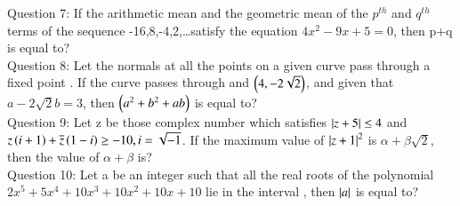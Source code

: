\documentclass[journal,12pt,twocolumn]{IEEEtran}
\theoremstyle{remark}
\begin{document}
Question 7: If the arithmetic mean and the geometric mean of the $p^{th}$ and $q^{th}$ terms of the sequence -16,8,-4,2,\ldots satisfy the equation $4x^2-9x+5=0$, then p+q is equal to?\vspace{0.5mm}\\
Question 8: Let the normals at all the points on a given curve pass through a fixed point . If the curve passes through  and $\left(4,-2\sqrt{2}\right)$, and given that $a-2\sqrt{2}b = 3$, then $\left(a^2+b^2+ab\right)$ is equal to?\vspace{0.5mm}\\
Question 9: Let z be those complex number which satisfies $\left\vert z+5\right\vert\leq 4$ and $z\left(i+1\right)+\overline{z}\left(1-i\right)\geq-10, i = \sqrt{-1}$. If the maximum value of $\left\vert z+1\right\vert^2$ is $\alpha + \beta \sqrt{2}$, then the value of $\alpha+\beta$ is?\vspace{0.5mm}\\
Question 10: Let a be an integer such that all the real roots of the polynomial $2x^5+5x^4+10x^3+10x^2+10x+10$ lie in the interval , then $\left\vert a\right\vert$ is equal to?
\end{document}
